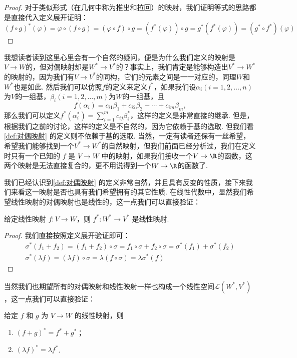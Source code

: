 \begin{proof}
    对于类似形式（在几何中称为推出和拉回）的映射，我们证明等式的思路都是直接代入定义展开证明：
    \[
        (f \circ g)^* (\varphi) = \varphi \circ (f \circ g) = (\varphi \circ f) \circ g = (f^*(\varphi)) \circ g = g^* (f^*(\varphi)) = (g^* \circ f^*)(\varphi)
    \]
\end{proof}

我想读者读到这里心里会有一个自然的疑问，便是为什么我们定义的映射是$V\to W$的，但对偶映射却是$W^*\to V^*$的？事实上，我们肯定是能够构造出$V^*\to W^*$的映射的，因为我们有$V\to V^*$的同构，它们的元素之间是一一对应的，同理$W$和$W^*$也是如此. 然后我们可以仿照$f$的定义来定义$f^*$，如果我们设$\alpha_i(i=1,2,\ldots,n)$为$V$的一组基，$\beta_i(i=1,2,\ldots,m)$为$W$的一组基，且
\[f(\alpha_i)=c_{i1}\beta_1+c_{i2}\beta_2+\cdots+c_{im}\beta_m,\]
那么我们可以定义$f^*(\alpha_i^*)=\sum\limits_{i=1}^m c_{ij}\beta_i^*$，这样的定义是非常直接的继承. 但是，根据我们之前的讨论，这样的定义是不自然的，因为它依赖于基的选取. 但我们看\autoref{def:对偶映射} 的定义则不依赖于基的选取. 当然，一定有读者还保有一丝希望，希望我们能够找到一个$V^*\to W^*$的自然映射，但我们前面已经分析过，我们在定义时只有一个已知的 $f$ 是 $V\to W$ 中的映射，如果我们接收一个$V\to \R$的函数，这两个映射是无法直接复合的，更不用说得到一个$W\to \R$的函数了.

我们已经认识到\autoref{def:对偶映射} 的定义非常自然，并且具有反变的性质，接下来我们来看这一映射是否也具有我们希望拥有的其它性质. 在线性代数中，显然我们希望线性映射的对偶映射也是线性的，这一点我们可以直接验证：
\begin{lemma}{}{}
    给定线性映射 $f\colon V \to W$，则 $f^*: W^* \to V^*$ 是线性映射.
\end{lemma}
\begin{proof}
    我们直接按照定义展开验证即可：
    \begin{gather*}
        \sigma^*(f_1+f_2)=(f_1+f_2)\circ\sigma=f_1\circ\sigma+f_2\circ\sigma=\sigma^*(f_1)+\sigma^*(f_2) \\
        \sigma^*(\lambda f)=(\lambda f)\circ\sigma=\lambda(f\circ\sigma)=\lambda\sigma^*(f)
    \end{gather*}
\end{proof}

当然我们也期望所有的对偶映射和线性映射一样也构成一个线性空间$\mathcal{L}(W^*,V^*)$，这一点我们可以直接验证：
\begin{lemma}{}{}
    给定 $f$ 和 $g$ 为 $V \to W$ 的线性映射，则
    \begin{enumerate}
        \item $(f + g)^* = f^* + g^*$；
        \item $(\lambda f)^* = \lambda f^*$.
    \end{enumerate}
\end{lemma}

